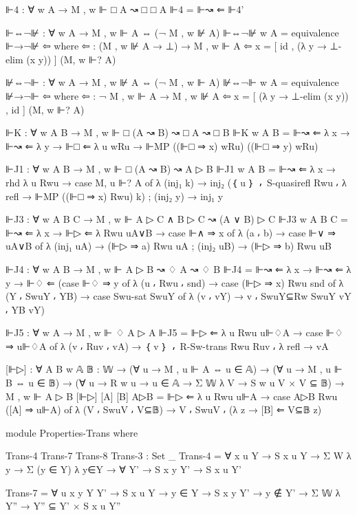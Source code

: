 \begin{spverbatim}
      ⊩4 : ∀ {w A} → M , w ⊩ □ A ↝ □ □ A
      ⊩4 = ⊩↝ ⇐ ⊩4'

      ⊩⇔¬⊮ : ∀ {w A} → M , w ⊩ A ⇔ (¬ M , w ⊮ A)
      ⊩⇔¬⊮ {w} {A} = equivalence ⊩→¬⊮ ⇦
        where
        ⇦ : (M , w ⊮ A → ⊥) → M , w ⊩ A
        ⇦ x = [ id , (λ y → ⊥-elim (x y)) ] (M, w ⊩? A)

      ⊮⇔¬⊩ : ∀ {w A} → M , w ⊮ A ⇔ (¬ M , w ⊩ A)
      ⊮⇔¬⊩ {w} {A} = equivalence ⊮→¬⊩ ⇦
        where
        ⇦ : ¬ M , w ⊩ A → M , w ⊮ A
        ⇦ x = [ (λ y → ⊥-elim (x y)) , id ] (M, w ⊩? A)

      ⊩K : ∀ {w A B} → M , w ⊩ □ (A ↝ B) ↝ □ A ↝ □ B
      ⊩K {w} {A} {B} = ⊩↝ ⇐ λ x → ⊩↝ ⇐ λ y → ⊩□ ⇐
        λ {u} wRu → ⊩MP ((⊩□ ⇒ x) wRu) ((⊩□ ⇒ y) wRu)


      ⊩J1 : ∀ {w A B} → M , w ⊩ □ (A ↝ B) ↝ A ▷ B
      ⊩J1 {w} {A} {B} = ⊩↝ ⇐ λ x → rhd λ { {u} Rwu → case M, u ⊩? A of
        λ { (inj₁ k) → inj₂ (｛ u ｝ ⸴ S-quasirefl Rwu ⸴
        λ {refl → ⊩MP ((⊩□ ⇒ x) Rwu) k})
        ; (inj₂ y) → inj₁ y}}


      ⊩J3 : ∀ {w A B C} → M , w ⊩ A ▷ C ∧ B ▷ C ↝ (A ∨ B) ▷ C
      ⊩J3 {w} {A} {B} {C} = ⊩↝ ⇐ λ x → ⊩▷ ⇐ λ Rwu uA∨B → case ⊩∧ ⇒ x of
        λ {(a ⸴ b) → case ⊩∨ ⇒ uA∨B of
        λ { (inj₁ uA) → (⊩▷ ⇒ a) Rwu uA ;
        (inj₂ uB) → (⊩▷ ⇒ b) Rwu uB} }

      ⊩J4 : ∀ {w A B} → M , w ⊩ A ▷ B ↝ ♢ A ↝ ♢ B
      ⊩J4 = ⊩↝ ⇐ λ x → ⊩↝ ⇐ λ y → ⊩♢ ⇐ (case ⊩♢ ⇒ y of
        λ { (u ⸴ Rwu ⸴ snd) → case (⊩▷ ⇒ x) Rwu snd of
        λ { (Y ⸴ SwuY ⸴ YB) → case Swu-sat SwuY of
        λ { (v ⸴ vY) → v ⸴ SwuY⊆Rw SwuY vY ⸴ YB vY}}})

      ⊩J5 : ∀ {w A} → M , w ⊩ ♢ A ▷ A
      ⊩J5 = ⊩▷ ⇐ λ {u} Rwu u⊩♢A → case ⊩♢ ⇒ u⊩♢A of
        λ { (v ⸴ Ruv ⸴ vA) → ｛ v ｝ ⸴ R-Sw-trans Rwu Ruv
          ⸴ λ {refl → vA}}

      [⊩▷] : ∀ {A B w} {𝔸 𝔹 : 𝕎}
        → (∀ {u} → M , u ⊩ A ⇔ u ∈ 𝔸)
        → (∀ {u} → M , u ⊩ B ⇔ u ∈ 𝔹)
        → (∀ {u} → R w u → u ∈ 𝔸 → Σ 𝕎 λ V → S w u V × V ⊆ 𝔹)
        → M , w ⊩ A ▷ B
      [⊩▷] [A] [B] A▷B = ⊩▷ ⇐ λ { {u} Rwu u⊩A → case A▷B Rwu ([A] ⇒ u⊩A) of
        λ { (V ⸴ SwuV ⸴ V⊆𝔹) → V ⸴ SwuV ⸴ (λ {z → [B] ⇐ V⊆𝔹 z})}}

      module Properties-Trans where

        Trans-4 Trans-7 Trans-8 Trans-3 : Set _
        Trans-4 = ∀ {x u Y} → S x u Y → Σ W λ y → Σ (y ∈ Y) λ y∈Y → ∀ {Y'} → S x y Y' → S x u Y'

        Trans-7 = ∀ {u x y Y Y'} → S x u Y → y ∈ Y → S x y Y' → y ∉ Y'
          → Σ 𝕎 λ Y'' → Y'' ⊆ Y' × S x u Y''


\end{spverbatim}
